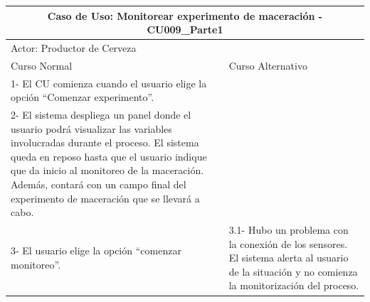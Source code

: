     
    \begin{minipage}{0.95\textwidth}
    \begin{center}
    \begin{tabularx}{\textwidth}{ | X | X |}
        \hline
        \multicolumn{2}{|c|}{\textbf{Caso de Uso: Monitorear experimento de maceración - CU009\_Parte1}} \\
        \hline
        \multicolumn{2}{|l|}{Actor: Productor de Cerveza} \\
        \hline
        Curso Normal & Curso Alternativo \\
        \hline
        1- El CU comienza cuando el usuario elige la opción “Comenzar experimento”. & \\
        \hline
        2- El sistema despliega un panel donde el usuario podrá visualizar las variables involucradas durante el proceso. El sistema queda en reposo hasta que el usuario indique que da inicio al monitoreo de la maceración. Además, contará con un campo  final del experimento de maceración que se llevará a cabo. &
        \\
        \hline
        3- El usuario elige la opción “comenzar monitoreo”. & 3.1- Hubo un problema con la conexión de los sensores. El sistema alerta al usuario de la situación y no comienza la monitorización del proceso.
        \\
        \hline
        \end{tabularx}
    \label{CU009_a}
    \end{center}
    \end{minipage}
    
